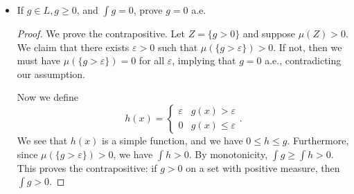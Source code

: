 \begin{itemize}
\begin{proof}
Note that for any $E_j \subset \Omega \setminus N$, we have $\mu(E_j) = 0$.
Now
\begin{align*}
	\int g d \mu &= \sum_{j} a_j \mu(E_j)\\
	&= \sum_{j: E_j \subset N} a_j \mu(E_j) \\
	&\le \sum_{j: E_j \subset N} \operatorname{sup} g \mu(E_j) \\
	&= \operatorname{sup} g \sum_{j: E_j \subset N}  \mu(E_j) \\
	&= \operatorname{sup} g \mu(N)\\
	&\le \operatorname{sup} f \mu(N) 
.\end{align*}
Therefore
\[
	\int f d \mu
	= \operatorname{sup} _{0\le g\le f, g \text{ simple}} \int g d \mu \le \operatorname{sup} f \mu(N)
.\] 
\end{proof}


\item If $g \in L, g \ge 0$, and $\int  g =0$, prove $g = 0$ a.e.
\begin{proof}
	We prove the contrapositive. Let $Z = \{g > 0\} $ and suppose $\mu(Z) > 0$. We claim that there exists $\varepsilon>0$ such that $\mu\left( \{g > \varepsilon\}  \right) >0$. If not, then we must have $\mu\left( \{g > \varepsilon\}  \right)  = 0$ for all $\varepsilon$, implying that $g = 0$ a.e., contradicting our assumption.

	Now we define
	\[
		h(x) = \begin{cases}
			\varepsilon & g(x) > \varepsilon \\
			0 & g(x) \le \varepsilon
		\end{cases}
	.\] 
	We see that $h(x)$ is a simple function, and we have $0 \le  h \le  g$. Furthermore, since $\mu\left( \{g > \varepsilon\}  \right) >0$, we have $\int h > 0$. By monotonicity, $\int g \ge  \int  h > 0$. This proves the contrapositive: if $g > 0$ on a set with positive measure, then $\int g > 0$.
\end{proof}


\end{itemize}
